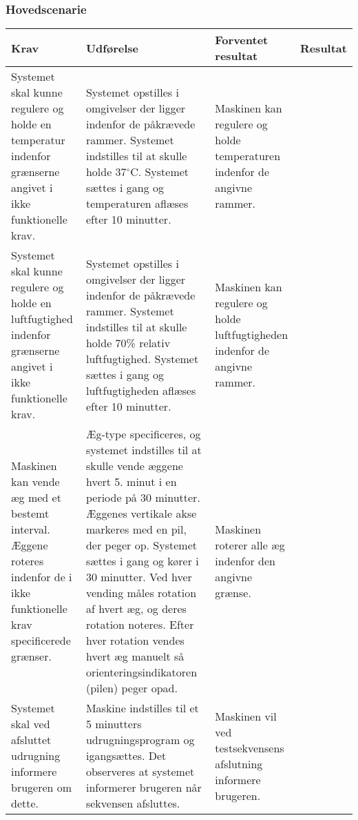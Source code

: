  
 \subsubsection{Hovedscenarie}
\begin{center}

	\begin{longtable}{| p{3cm} | p{3cm} | p{3cm} | p{3cm} |}
		\hline
		Krav & Udførelse & Forventet resultat & Resultat \\ \hline
		
		
		Systemet skal kunne regulere og holde en temperatur indenfor grænserne angivet i ikke funktionelle krav.
		&Systemet opstilles i omgivelser der ligger indenfor de påkrævede rammer. Systemet indstilles til at skulle holde 37$^\circ$C. Systemet sættes i gang og temperaturen aflæses efter 10 minutter. 
		&Maskinen kan regulere og holde temperaturen indenfor de angivne rammer. 
		& \\ \hline
		
		Systemet skal kunne regulere og holde en luftfugtighed indenfor grænserne angivet i ikke funktionelle krav.
		&Systemet opstilles i omgivelser der ligger indenfor de påkrævede rammer. Systemet indstilles til at skulle holde 70\% relativ luftfugtighed. Systemet sættes i gang og luftfugtigheden aflæses efter 10 minutter.
		&Maskinen kan regulere og holde luftfugtigheden indenfor de angivne rammer.
		& \\ \hline
		
		Maskinen kan vende æg med et bestemt interval. Æggene roteres indenfor de i ikke funktionelle krav specificerede grænser.
		&Æg-type specificeres, og systemet indstilles til at skulle vende æggene hvert 5. minut i en periode på 30 minutter. Æggenes vertikale akse markeres med en pil, der peger op. Systemet sættes i gang og kører i 30 minutter. Ved hver vending måles rotation af hvert æg, og deres rotation noteres. Efter hver rotation vendes hvert æg manuelt så orienteringsindikatoren (pilen) peger opad. 
		&Maskinen roterer alle æg indenfor den angivne grænse.
		& \\ \hline		
		
		Systemet skal ved afsluttet udrugning informere brugeren om dette.
		&Maskine indstilles til et 5 minutters udrugningsprogram og igangsættes. Det observeres at systemet informerer brugeren når sekvensen afsluttes.
		&Maskinen vil ved testsekvensens afslutning informere brugeren.
		& \\ \hline

		
		
	\end{longtable}
\end{center}
